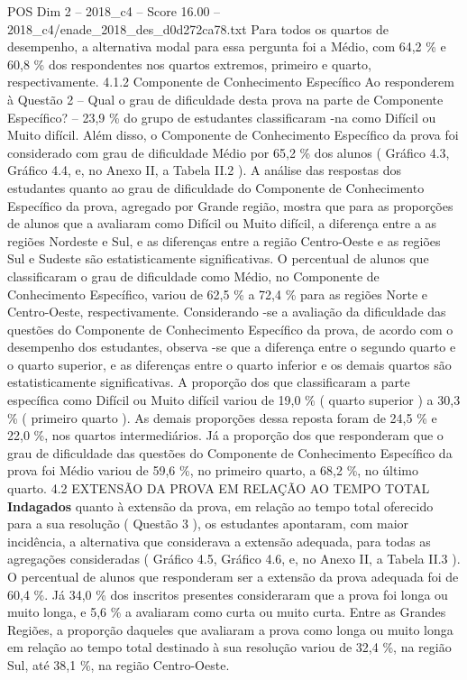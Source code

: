 \begin{textsample}{POS Dim 2 – 2018\_c4 – Score 16.00 – 2018\_c4/enade\_2018\_des\_d0d272ca78.txt}
Para todos os quartos de desempenho, a alternativa modal para essa pergunta foi a Médio, com 64,2 \% e 60,8 \% dos respondentes nos quartos extremos, primeiro e quarto, respectivamente. 4.1.2 Componente de Conhecimento Específico Ao responderem à Questão 2 – Qual o grau de dificuldade desta prova na parte de Componente Específico? – 23,9 \% do grupo de estudantes classificaram -na como Difícil ou Muito difícil.
Além disso, o Componente de Conhecimento Específico da prova foi considerado com grau de dificuldade Médio por 65,2 \% dos alunos ( Gráfico 4.3, Gráfico 4.4, e, no Anexo II, a Tabela II.2 ).
A análise das respostas dos estudantes quanto ao grau de dificuldade do Componente de Conhecimento Específico da prova, agregado por Grande região, mostra que para as proporções de alunos que a avaliaram como Difícil ou Muito difícil, a diferença entre a as regiões Nordeste e Sul, e as diferenças entre a região Centro-Oeste e as regiões Sul e Sudeste são estatisticamente significativas.
O percentual de alunos que classificaram o grau de dificuldade como Médio, no Componente de Conhecimento Específico, variou de 62,5 \% a 72,4 \% para as regiões Norte e Centro-Oeste, respectivamente.
Considerando -se a avaliação da dificuldade das questões do Componente de Conhecimento Específico da prova, de acordo com o desempenho dos estudantes, observa -se que a diferença entre o segundo quarto e o quarto superior, e as diferenças entre o quarto inferior e os demais quartos são estatisticamente significativas.
A proporção dos que classificaram a parte específica como Difícil ou Muito difícil variou de 19,0 \% ( quarto superior ) a 30,3 \% ( primeiro quarto ).
As demais proporções dessa reposta foram de 24,5 \% e 22,0 \%, nos quartos intermediários.
Já a proporção dos que responderam que o grau de dificuldade das questões do Componente de Conhecimento Específico da prova foi Médio variou de 59,6 \%, no primeiro quarto, a 68,2 \%, no último quarto. 4.2 EXTENSÃO DA PROVA EM RELAÇÃO AO TEMPO TOTAL \textbf{Indagados} quanto à extensão da prova, em relação ao tempo total oferecido para a sua resolução ( Questão 3 ), os estudantes apontaram, com maior incidência, a alternativa que considerava a extensão adequada, para todas as agregações consideradas ( Gráfico 4.5, Gráfico 4.6, e, no Anexo II, a Tabela II.3 ).
O percentual de alunos que responderam ser a extensão da prova adequada foi de 60,4 \%.
Já 34,0 \% dos inscritos presentes consideraram que a prova foi longa ou muito longa, e 5,6 \% a avaliaram como curta ou muito curta.
Entre as Grandes Regiões, a proporção daqueles que avaliaram a prova como longa ou muito longa em relação ao tempo total destinado à sua resolução variou de 32,4 \%, na região Sul, até 38,1 \%, na região Centro-Oeste.

\end{textsample}
